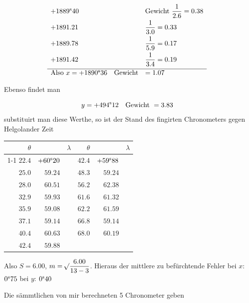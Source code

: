 \[
\begin{array}{ll}
+1889^{\rm s}40 & \text{Gewicht } \dfrac{1}{2.6}=0.38 \\[7pt]
+1891.21 & \dfrac{1}{3.0}=0.33 \\[7pt]
+1889.78 & \dfrac{1}{5.9}=0.17 \\[7pt]
+1891.42 & \dfrac{1}{3.4}=0.19 \\[7pt]
\hline
\text{Also } x=+1890^{\rm s}36 \quad \text{Gewicht} & =1.07
\end{array}
\]

Ebenso findet man

\[
y=+494^{\rm s}12 \quad \text{Gewicht } =3.83
\]
\noindent substituirt man diese Werthe, so ist der Stand des fingirten Chronometers gegen Helgolander Zeit

\begin{center}
\begingroup\small\renewcommand{\arraystretch}{1.25}
\begin{tabular}{r|r r@{\qquad}r|r r}
$\theta$ & & $\lambda$ & $\theta$ & & $\lambda$ \\
\cline{1-1}\cline{3-4}\cline{6-6}
$22.4$ & $+60^{\rm s}20$ & \raisebox{-7pt}{$-0^{\rm s}96$} & $42.4$ & $+59^{\rm s}88$ & \raisebox{-7pt}{$-0^{\rm s}62$} \\
$25.0$ & $59.24$ & \raisebox{-7pt}{$+1.27$} & $48.3$ & $59.24$ & \raisebox{-7pt}{$+3.14$} \\
$28.0$ & $60.51$ & \raisebox{-7pt}{$-0.58$} & $56.2$ & $62.38$ & \raisebox{-7pt}{$-1.06$} \\
$32.9$ & $59.93$ & \raisebox{-7pt}{$-0.85$} & $61.6$ & $61.32$ & \raisebox{-7pt}{$+0.27$} \\
$35.9$ & $59.08$ & \raisebox{-7pt}{$+0.06$} & $62.2$ & $61.59$ & \raisebox{-7pt}{$-2.45$} \\
$37.1$ & $59.14$ & \raisebox{-7pt}{$+1.47$} & $66.8$ & $59.14$ & \raisebox{-7pt}{$+1.05$} \\
$40.4$ & $60.63$ & \raisebox{-7pt}{$-0.75$} & $68.0$ & $60.19$ &  \\
$42.4$ & $59.88$ &  &  &  &  \\
\end{tabular}
\endgroup
\end{center}

Also $S=6.00$, $m=\mathord{{}^{}\!\surd}\dfrac{6.00}{13-3}$. Hieraus der mittlere zu befürchtende Fehler
bei $x$: $0^{\rm s}75$ bei $y$: $0^{\rm s}40$

Die sämmtlichen von mir berechneten 5 Chronometer geben

